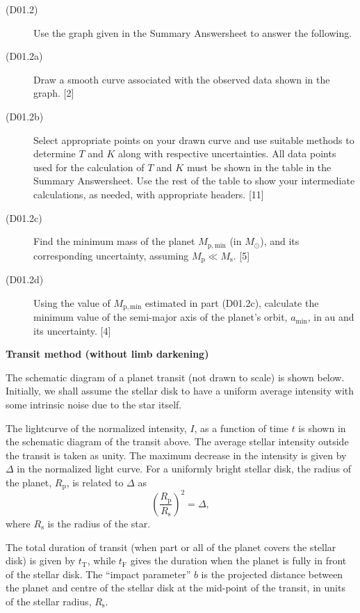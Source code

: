 \begin{description}
\item[(D01.2)] Use the graph given in the Summary Answersheet to answer the
  following.
\item[(D01.2a)] Draw a smooth curve associated with the observed data shown in
  the graph. \hfill[2]
\item[(D01.2b)] Select appropriate points on your drawn curve and use suitable
  methods to determine $T$ and $K$ along with respective uncertainties. All
  data points used for the calculation of $T$ and $K$ must be shown in the
  table in the Summary Answersheet. Use the rest of the table to show your
  intermediate calculations, as needed, with appropriate headers. \hfill[11]
\item[(D01.2c)] Find the minimum mass of the planet $M_{\mathrm{p,min}}$ (in
  $M_\odot$), and its corresponding uncertainty, assuming
  $M_{\mathrm{p}} \ll M_{\mathrm{s}}$. \hfill[5]
\item[(D01.2d)] Using the value of $M_{\mathrm{p,min}}$ estimated in part
  (D01.2c), calculate the minimum value of the semi-major axis of the planet's
  orbit, $a_{\mathrm{min}}$, in au and its uncertainty. \hfill[4]
\end{description}

\medskip\noindent\textbf{Transit method (without limb darkening)}

The schematic diagram of a planet transit (not drawn to scale) is shown
below. Initially, we shall assume the stellar disk to have a uniform average
intensity with some intrinsic noise due to the star itself.


The lightcurve of the normalized intensity, $I$, as a function of time $t$ is
shown in the schematic diagram of the transit above. The average stellar
intensity outside the transit is taken as unity. The maximum decrease in the
intensity is given by $\Delta$ in the normalized light curve. For a uniformly
bright stellar disk, the radius of the planet, $R_{\mathrm{p}}$, is related to
$\Delta$ as
\[
\left(\frac{R_{\mathrm{p}}}{R_{\mathrm{s}}}\right)^2 = \Delta,
\]
where $R_{\mathrm{s}}$ is the radius of the star.

The total duration of transit (when part or all of the planet covers the
stellar disk) is given by $t_{\mathrm{T}}$, while $t_{\mathrm{F}}$ gives the
duration when the planet is fully in front of the stellar disk. The ``impact
parameter'' $b$ is the projected distance between the planet and centre of the
stellar disk at the mid-point of the transit, in units of the stellar radius,
$R_{\mathrm{s}}$.

